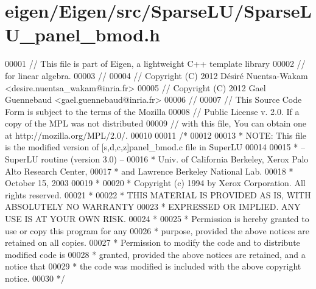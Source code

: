 \hypertarget{eigen_2_eigen_2src_2_sparse_l_u_2_sparse_l_u__panel__bmod_8h_source}{}\section{eigen/\+Eigen/src/\+Sparse\+L\+U/\+Sparse\+L\+U\+\_\+panel\+\_\+bmod.h}
\label{eigen_2_eigen_2src_2_sparse_l_u_2_sparse_l_u__panel__bmod_8h_source}

\begin{DoxyCode}
00001 \textcolor{comment}{// This file is part of Eigen, a lightweight C++ template library}
00002 \textcolor{comment}{// for linear algebra.}
00003 \textcolor{comment}{//}
00004 \textcolor{comment}{// Copyright (C) 2012 Désiré Nuentsa-Wakam <desire.nuentsa\_wakam@inria.fr>}
00005 \textcolor{comment}{// Copyright (C) 2012 Gael Guennebaud <gael.guennebaud@inria.fr>}
00006 \textcolor{comment}{//}
00007 \textcolor{comment}{// This Source Code Form is subject to the terms of the Mozilla}
00008 \textcolor{comment}{// Public License v. 2.0. If a copy of the MPL was not distributed}
00009 \textcolor{comment}{// with this file, You can obtain one at http://mozilla.org/MPL/2.0/.}
00010 
00011 \textcolor{comment}{/* }
00012 \textcolor{comment}{ }
00013 \textcolor{comment}{ * NOTE: This file is the modified version of [s,d,c,z]panel\_bmod.c file in SuperLU }
00014 \textcolor{comment}{ }
00015 \textcolor{comment}{ * -- SuperLU routine (version 3.0) --}
00016 \textcolor{comment}{ * Univ. of California Berkeley, Xerox Palo Alto Research Center,}
00017 \textcolor{comment}{ * and Lawrence Berkeley National Lab.}
00018 \textcolor{comment}{ * October 15, 2003}
00019 \textcolor{comment}{ *}
00020 \textcolor{comment}{ * Copyright (c) 1994 by Xerox Corporation.  All rights reserved.}
00021 \textcolor{comment}{ *}
00022 \textcolor{comment}{ * THIS MATERIAL IS PROVIDED AS IS, WITH ABSOLUTELY NO WARRANTY}
00023 \textcolor{comment}{ * EXPRESSED OR IMPLIED.  ANY USE IS AT YOUR OWN RISK.}
00024 \textcolor{comment}{ *}
00025 \textcolor{comment}{ * Permission is hereby granted to use or copy this program for any}
00026 \textcolor{comment}{ * purpose, provided the above notices are retained on all copies.}
00027 \textcolor{comment}{ * Permission to modify the code and to distribute modified code is}
00028 \textcolor{comment}{ * granted, provided the above notices are retained, and a notice that}
00029 \textcolor{comment}{ * the code was modified is included with the above copyright notice.}
00030 \textcolor{comment}{ */}

\end{DoxyCode}
